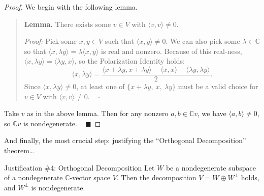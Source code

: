 \begin{proof}
    We begin with the following lemma.
    \begin{quote}
        \textbf{Lemma.} There exists some $v \in V$ with $\langle v, v \rangle \neq 0$.

        \emph{Proof:} Pick some $x, y \in V$ such that $\langle x, y \rangle \neq 0$.  We can also pick some $\lambda \in \mathbb{C}$ so that $\langle x, \lambda y \rangle = \lambda \langle x, y \rangle$ is real and nonzero.  Because of this real-ness, $\langle x, \lambda y \rangle = \langle \lambda y, x \rangle$, so the Polarization Identity holds:
        \[ \langle x, \lambda y \rangle = \dfrac{\langle x + \lambda y, x + \lambda y \rangle - \langle x, x \rangle - \langle \lambda y, \lambda y \rangle}{2}. \]
        Since $\langle x, \lambda y \rangle \neq 0$, at least one of $\{x + \lambda y, \ x, \ \lambda y \}$ must be a valid choice for $v \in V$ with $\langle v, v \rangle \neq 0$. ~ $\square$
    \end{quote}
    Take $v$ as in the above lemma.  Then for any nonzero $a, b \in \mathbb{C}v$, we have $\langle a, b \rangle \neq 0$, so $\mathbb{C}v$ is nondegenerate. ~ $\blacksquare$
\end{proof}

And finally, the most crucial step: justifying the ``Orthogonal Decomposition'' theorem\dots

\begin{theorem}{Justification \#4: Orthogonal Decomposition}
    Let $W$ be a nondegenerate subspace of a nondegenerate $\mathbb{C}$-vector space $V$.  Then the decomposition $V = W \oplus W^{\perp}$ holds, and $W^{\perp}$ is nondegenerate.
\end{theorem}

